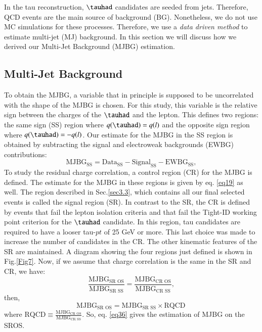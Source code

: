 In the tau reconstruction, $\tauhad$ candidates are seeded from jets. Therefore, QCD events are the main source of background (BG). Nonetheless, we do not use MC simulations for these processes. Therefore, we use a \textit{data driven method} to estimate multi-jet (MJ) background. In this section we will discuss how we derived our Multi-Jet Background (MJBG) estimation.

\subsection{Multi-Jet Background}
To obtain the MJBG, a variable that in principle is supposed to be uncorrelated with the shape of the MJBG is chosen. For this study, this variable is the relative sign between the charges of the $\tauhad$ and the lepton. This defines two regions: the same sign (SS) region where $q(\tauhad)=q(l)$ and the opposite sign region where $q(\tauhad)=-q(l)$. Our estimate for the MJBG in the SS region is obtained by subtracting the signal and electroweak backgrounds (EWBG) contributions:
\begin{equation}
\text{MJBG}_{\text{SS}}=\text{Data}_{\text{SS}}-\text{Signal}_{\text{SS}}-\text{EWBG}_{\text{SS}},
\label{eq19}
\end{equation}
To study the residual charge correlation, a control region (CR) for the MJBG is defined. The estimate for the MJBG in these regions is given by eq. \ref{eq19} as well. The region described in Sec.\ref{sec3.3}, which contains all our final selected events is called the signal region (SR). In contrast to the SR, the CR is defined by events that fail the lepton isolation criteria and that fail the Tight-ID working point criterion for the $\tauhad$ candidate. In this region, tau candidates are required to have a looser tau-$pt$ of 25 GeV or more. This last choice was made to increase the number of candidates in the CR. The other kinematic features of the SR are maintained. A diagram showing the four regions just defined is shown in Fig.\ref{Fig7}. Now, if we assume that charge correlation is the same in the SR and CR, we have:
 \begin{equation}
 \frac{\text{MJBG}_{\text{SR OS}}}{\text{MJBG}_{\text{SR SS}}}=\frac{\text{MJBG}_{\text{CR OS}}}{\text{MJBG}_{\text{CR SS}}},
 \end{equation}
then,
 \begin{equation}
\text{MJBG}_{\text{SR OS}}=\text{MJBG}_{\text{SR SS}}\times \text{RQCD}\,
\label{eq36}
\end{equation}
where $\text{RQCD}\equiv\frac{\text{MJBG}_{\text{CR OS}}}{\text{MJBG}_{\text{CR SS}}}$. So, eq. \eqref{eq36} gives the estimation of MJBG on the SROS.
